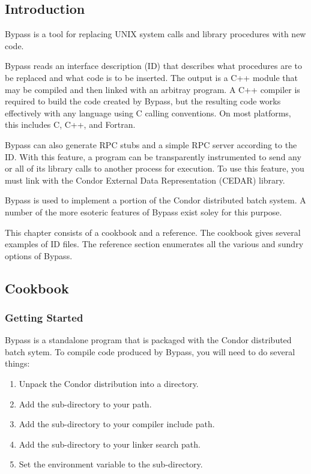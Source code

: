
\subsection{Introduction}

Bypass is a tool for replacing UNIX system calls and library procedures with new code.

Bypass reads an interface description (ID) that describes what procedures are to be replaced and what code is to be inserted.  The output is a C++ module that may be compiled and then linked with an arbitray program.  A C++ compiler is required to build the code created by Bypass, but the resulting code works effectively with any language using C calling conventions.  On most platforms, this includes C, C++, and Fortran.

Bypass can also generate RPC stubs and a simple RPC server according to the ID.  With this feature, a program can be transparently instrumented to send any or all of its library calls to another process for execution.   To use this feature, you must link with the Condor External Data Representation (CEDAR) library.

Bypass is used to implement a portion of the Condor distributed batch system.  A number of the more esoteric features of Bypass exist soley for this purpose.

This chapter consists of a cookbook and a reference.  The cookbook gives several examples of ID files.  The reference section enumerates all the various and sundry options of Bypass.

\subsection{Cookbook}

\subsubsection{Getting Started}

Bypass is a standalone program that is packaged with the Condor distributed batch sytem.  To compile code produced by Bypass, you will need to do several things:

\begin{enumerate}
\item Unpack the Condor distribution into a directory.
\item Add the  sub-directory to your path.
\item Add the  sub-directory to your compiler include path.
\item Add the  sub-directory to your linker search path.
\item Set the environment variable  to the  sub-directory.
\end{enumerate}


